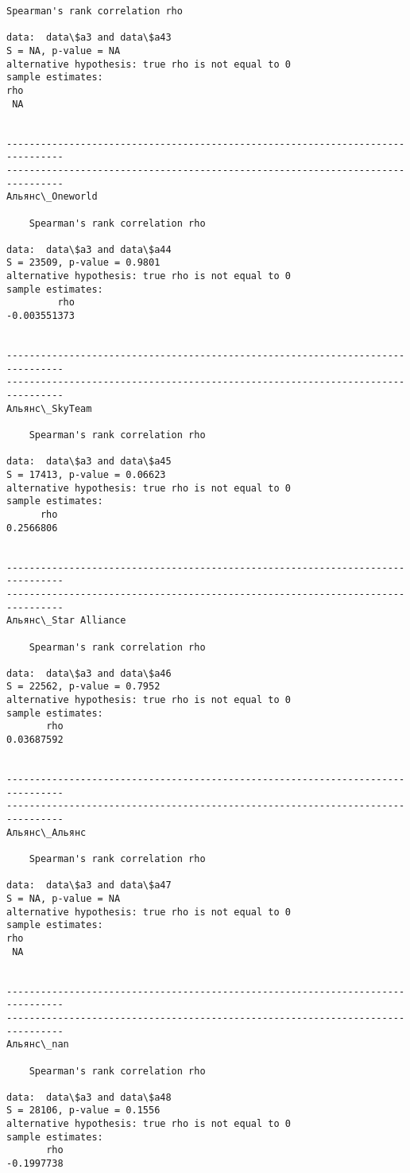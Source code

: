 \documentclass[11pt,mathletters]{article}
\begin{document}
\begin{Verbatim}[commandchars=\\\{\}]
	Spearman's rank correlation rho

data:  data\$a3 and data\$a43
S = NA, p-value = NA
alternative hypothesis: true rho is not equal to 0
sample estimates:
rho 
 NA 


--------------------------------------------------------------------------------
--------------------------------------------------------------------------------
Альянс\_Oneworld

	Spearman's rank correlation rho

data:  data\$a3 and data\$a44
S = 23509, p-value = 0.9801
alternative hypothesis: true rho is not equal to 0
sample estimates:
         rho 
-0.003551373 


--------------------------------------------------------------------------------
--------------------------------------------------------------------------------
Альянс\_SkyTeam

	Spearman's rank correlation rho

data:  data\$a3 and data\$a45
S = 17413, p-value = 0.06623
alternative hypothesis: true rho is not equal to 0
sample estimates:
      rho 
0.2566806 


--------------------------------------------------------------------------------
--------------------------------------------------------------------------------
Альянс\_Star Alliance 

	Spearman's rank correlation rho

data:  data\$a3 and data\$a46
S = 22562, p-value = 0.7952
alternative hypothesis: true rho is not equal to 0
sample estimates:
       rho 
0.03687592 


--------------------------------------------------------------------------------
--------------------------------------------------------------------------------
Альянс\_Альянс

	Spearman's rank correlation rho

data:  data\$a3 and data\$a47
S = NA, p-value = NA
alternative hypothesis: true rho is not equal to 0
sample estimates:
rho 
 NA 


--------------------------------------------------------------------------------
--------------------------------------------------------------------------------
Альянс\_nan

	Spearman's rank correlation rho

data:  data\$a3 and data\$a48
S = 28106, p-value = 0.1556
alternative hypothesis: true rho is not equal to 0
sample estimates:
       rho 
-0.1997738 



\end{Verbatim}
\end{document}
